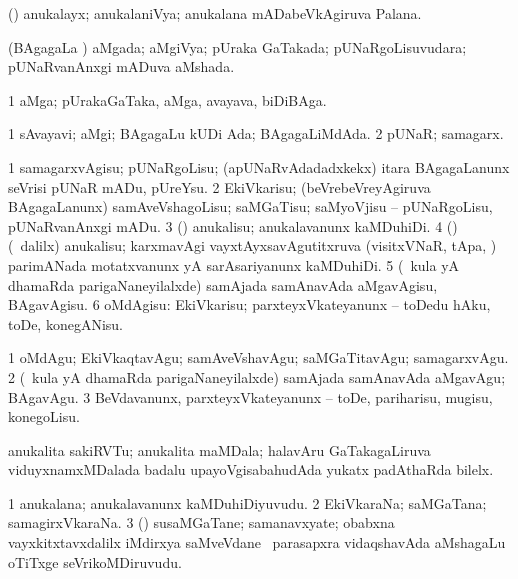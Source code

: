 \bentry
{}
\gl{\nA}
\bmng
(\ga) anukalayx; anukalaniVya; anukalana mADabeVkAgiruva Palana. 
\emng
\eentry

\bentry
{}
\gl{\gu}
\bmng
(BAgagaLa \vi) aMgada; aMgiVya; pUraka GaTakada; pUNaRgoLisuvudara; pUNaRvanAnxgi mADuva aMshada. 
\emng
\eentry

\bentry
{}
\gl{\nA}
\bmng
\bnum
\num{1} aMga; pUrakaGaTaka, aMga, avayava, biDiBAga. 
\enum
\emng
\eentry

\bentry
{}
\gl{\gu}
\bmng
\bnum
\num{1} sAvayavi; aMgi; BAgagaLu kUDi Ada; BAgagaLiMdAda. 
\num{2} pUNaR; samagarx. 
\enum
\emng
\eentry

\bentry
{}
\gl{\sakirx}
\bmng
\bnum
\num{1} samagarxvAgisu; pUNaRgoLisu; (apUNaRvAdadadxkekx) itara BAgagaLanunx seVrisi pUNaR mADu, pUreYsu. 
\num{2} EkiVkarisu; (beVrebeVreyAgiruva BAgagaLanunx) samAveVshagoLisu; saMGaTisu; saMyoVjisu -- pUNaRgoLisu, pUNaRvanAnxgi mADu. 
\num{3} (\ga) anukalisu; anukalavanunx kaMDuhiDi. 
\num{4} (\ga) (\kanmu\ \BUkaq dalilx) anukalisu; karxmavAgi vayxtAyxsavAgutitxruva (visitxVNaR, tApa, \mo) parimANada motatxvanunx yA sarAsariyanunx kaMDuhiDi. 
\num{5} (\kanmu\ kula yA dhamaRda parigaNaneyilalxde) samAjada samAnavAda aMgavAgisu, BAgavAgisu. 
\num{6} oMdAgisu: EkiVkarisu; parxteyxVkateyanunx -- toDedu hAku, toDe, konegANisu. 
\enum
\emng

\noindent 
\gl{\akirx}
\bmng
\bnum
\num{1} oMdAgu; EkiVkaqtavAgu; samAveVshavAgu; saMGaTitavAgu; samagarxvAgu. 
\num{2} (\kanmu\ kula yA dhamaRda parigaNaneyilalxde) samAjada samAnavAda aMgavAgu; BAgavAgu. 
\num{3} BeVdavanunx, parxteyxVkateyanunx -- toDe, pariharisu, mugisu, konegoLisu. 
\enum
\emng
\eentry

\bentry
{}
\gl{\nA}
\bmng
anukalita sakiRVTu; anukalita maMDala; halavAru GaTakagaLiruva viduyxnamxMDalada badalu upayoVgisabahudAda yukatx padAthaRda bilelx. 
\emng
\eentry

\bentry
{}
\gl{\nA}
\bmng
\bnum
\num{1} anukalana; anukalavanunx kaMDuhiDiyuvudu. 
\num{2} EkiVkaraNa; saMGaTana; samagirxVkaraNa. 
\num{3} (\mashA) susaMGaTane; samanavxyate; obabxna vayxkitxtavxdalilx iMdirxya saMveVdane \mo\ parasapxra vidaqshavAda aMshagaLu oTiTxge seVrikoMDiruvudu. 
\enum
\emng
\eentry

